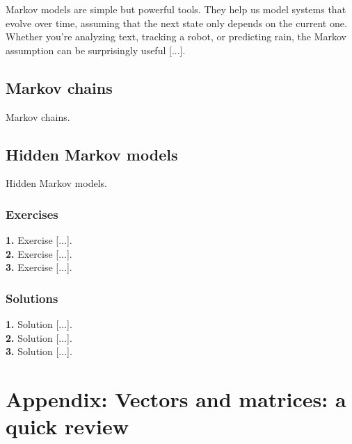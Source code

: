\documentclass{book}
\begin{document}
Markov models are simple but powerful tools. They help us model systems that evolve over time, assuming that the next state only depends on the current one. Whether you’re analyzing text, tracking a robot, or predicting rain, the Markov assumption can be surprisingly useful [...].

\section{Markov chains}
Markov chains.

\section{Hidden Markov models}
Hidden Markov models.

\newpage

\subsection*{Exercises}

\textbf{1.} Exercise [...].\\

\textbf{2.} Exercise [...].\\

\textbf{3.} Exercise [...].\\

\newpage

\subsection*{Solutions}

\textbf{1.} Solution [...].\\

\textbf{2.} Solution [...].\\

\textbf{3.} Solution [...].\\



\appendix



\chapter{Appendix: Vectors and matrices: a quick review}
\end{document}
